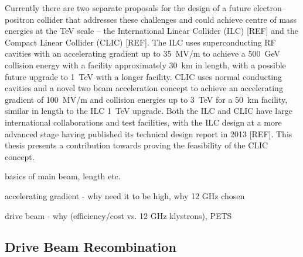 Currently there are two separate proposals for the design of a future electron--positron collider that addresses these challenges and could achieve centre of mass energies at the TeV scale -- the International Linear Collider (ILC) [REF] and the Compact Linear Collider (CLIC) [REF]. The ILC uses superconducting RF cavities with an accelerating gradient up to 35~MV/m to achieve a 500~GeV collision energy with a facility approximately 30~km in length, with a possible future upgrade to 1~TeV with a longer facility.  CLIC uses normal conducting cavities and a novel two beam acceleration concept to achieve an accelerating gradient of 100~MV/m and collision energies up to 3~TeV for a 50~km facility, similar in length to the ILC 1~TeV upgrade. Both the ILC and CLIC have large international collaborations and test facilities, with the ILC design at a more advanced stage having published its technical design report in 2013 [REF]. This thesis presents a contribution towards proving the feasibility of the CLIC concept.


basics of main beam, length etc.

accelerating gradient - why need it to be high, why 12 GHz chosen

drive beam - why (efficiency/cost vs. 12 GHz klystrons), PETS


\subsection{Drive Beam Recombination}
\label{ss:clicCombination}

